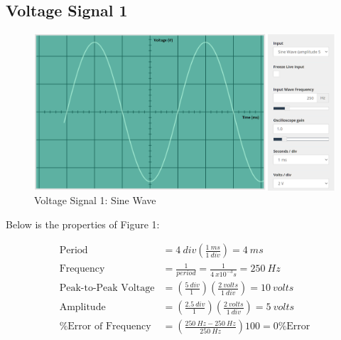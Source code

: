 \documentclass[12pt]{article}
\begin{document}
\subsection{Voltage Signal 1}
\begin{figure}[H]
    \begin{center}
        \includegraphics[scale=0.6]{Figure-1.png}
        \caption { Voltage Signal 1: Sine Wave}
    \end{center}
\end{figure}

\newpage

Below is the properties of Figure 1:

\begin{equation*}
    \begin{split}
        \text{Period} & = \SI{4}{div}\left(\frac{\SI{1}{ms}}{\SI{1}{div}}\right) = \SI{4}{ms} \\
    \text{Frequency} & = \frac{1}{period} =\frac{1}{\SI{4}{x10^{-3} s}} = \SI{250}{Hz} \\
        \text{Peak-to-Peak Voltage} & = \left(\frac{\SI{5}{div}}{\SI{1}{}}\right)\left(\frac{\SI{2}{volts}}{\SI{1}{div}}\right) = \SI{10}{volts} \\
        \text{Amplitude} & = \left(\frac{\SI{2.5}{div}}{\SI{1}{}}\right)\left(\frac{\SI{2}{volts}}{\SI{1}{div}}\right) = \SI{5}{volts} \\
        \text{\% Error of Frequency} & = \left(\frac{\SI{250}{Hz} - \SI{250}{Hz}}{\SI{250}{Hz}}\right)100 = 0 \text{\% Error}
    \end{split}
\end{equation*}
\end{document}
